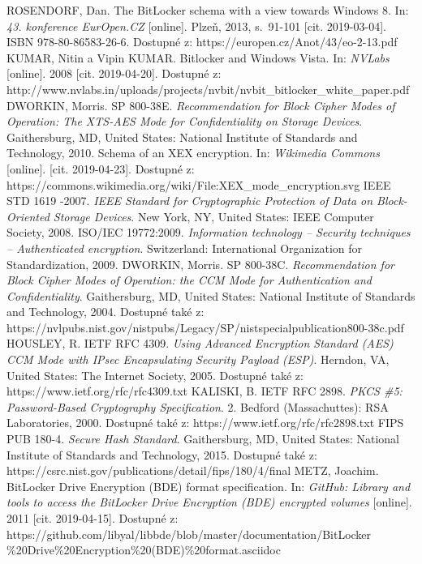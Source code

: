 \documentclass[a4paper,12pt]{article}
\begin{document}
{
ROSENDORF, Dan. The BitLocker schema with a view towards Windows 8. In: \textit{43. konference EurOpen.CZ} [online]. Plzeň, 2013, s.~91-101 [cit. 2019-03-04]. ISBN 978-80-86583-26-6. Dostupné z: https://europen.cz/Anot/43/eo-2-13.pdf
KUMAR, Nitin a Vipin KUMAR. Bitlocker and Windows Vista. In: \textit{NVLabs} [online]. 2008 [cit. 2019-04-20]. Dostupné z: http://www.nvlabs.in/uploads/projects/nvbit/nvbit\_bitlocker\_white\_paper.pdf
DWORKIN, Morris. SP 800-38E. \textit{Recommendation for Block Cipher Modes of Operation: The XTS-AES Mode for Confidentiality on Storage Devices}. Gaithersburg, MD, United States: National Institute of Standards and Technology, 2010.
Schema of an XEX encryption. In: \textit{Wikimedia Commons} [online]. [cit. 2019-04-23]. Dostupné z: https://commons.wikimedia.org/wiki/File:XEX\_mode\_encryption.svg
IEEE STD 1619 -2007. \textit{IEEE Standard for Cryptographic Protection of Data on Block-Oriented Storage Devices}. New York, NY, United States: IEEE Computer Society, 2008.
ISO/IEC 19772:2009. \textit{Information technology -- Security techniques -- Authenticated encryption}. Switzerland: International Organization for Standardization, 2009.
DWORKIN, Morris. SP 800-38C. \textit{Recommendation for Block Cipher Modes of Operation: the CCM Mode for Authentication and Confidentiality}. Gaithersburg, MD, United States: National Institute of Standards and Technology, 2004. Dostupné také z: https://nvlpubs.nist.gov/nistpubs/Legacy/SP/nistspecialpublication800-38c.pdf
HOUSLEY, R. IETF RFC 4309. \textit{Using Advanced Encryption Standard (AES) CCM Mode with IPsec Encapsulating Security Payload (ESP)}. Herndon, VA, United States: The Internet Society, 2005. Dostupné také z: https://www.ietf.org/rfc/rfc4309.txt
KALISKI, B. IETF RFC 2898. \textit{PKCS \#5: Password-Based Cryptography Specification}. 2. Bedford (Massachuttes): RSA Laboratories, 2000. Dostupné také z: https://www.ietf.org/rfc/rfc2898.txt
FIPS PUB 180-4. \textit{Secure Hash Standard}. Gaithersburg, MD, United States: National Institute of Standards and Technology, 2015. Dostupné také z: https://csrc.nist.gov/publications/detail/fips/180/4/final
METZ, Joachim. BitLocker Drive Encryption (BDE) format specification. In: \textit{GitHub: Library and tools to access the BitLocker Drive Encryption (BDE) encrypted volumes} [online]. 2011 [cit. 2019-04-15]. Dostupné z: https://github.com/libyal/libbde/blob/master/documentation/BitLocker\\\%20Drive\%20Encryption\%20(BDE)\%20format.asciidoc
}
\end{document}
